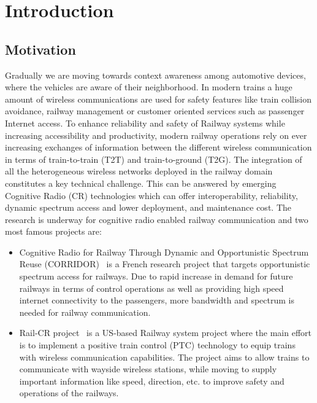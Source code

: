\chapter{Introduction}
\label{ch:introduction}
\section{Motivation}
Gradually we are moving towards context awareness among automotive devices, where the vehicles are aware of their neighborhood. In modern trains a huge amount of wireless communications are used for safety features like train collision avoidance, railway management or customer oriented services such as passenger Internet access. To enhance reliability and safety of Railway systems while increasing accessibility and productivity, modern railway operations rely on ever increasing exchanges of information between the different wireless communication in terms of train-to-train (T2T) and train-to-ground (T2G). The integration of all the heterogeneous wireless networks deployed in the railway domain constitutes a key technical challenge. This can be answered by emerging Cognitive Radio (CR) technologies which can offer interoperability, reliability, dynamic spectrum access and lower deployment, and maintenance cost. The research is underway for cognitive radio enabled railway communication and two most famous projects are:

\begin{itemize}

\item Cognitive Radio for Railway Through Dynamic and Opportunistic Spectrum Reuse (CORRIDOR)~\cite{corridor} is a French research project that targets opportunistic spectrum access for railways. Due to rapid increase in demand for future railways in terms of control operations as well as providing high speed internet connectivity to the passengers, more bandwidth and spectrum is needed for railway communication.

\item Rail-CR project~\cite{5621621} is a US-based Railway system project where the main effort is to implement a positive train control (PTC) technology to equip trains with wireless communication capabilities. The project aims to allow trains to communicate with wayside wireless stations, while moving to supply important information like speed, direction, etc. to improve safety and operations of the railways.

\end{itemize}

